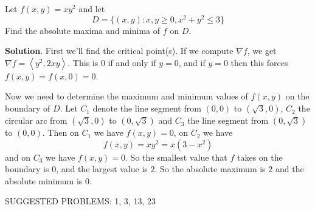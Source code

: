 \documentclass[10pt,]{book}
\theoremstyle{ptxplainnotitle}
\theoremstyle{ptxplaintitle}
\theoremstyle{ptxplainnotitle}
\theoremstyle{ptxplaintitle}
\theoremstyle{ptxplainnotitle}
\theoremstyle{ptxplaintitle}
\theoremstyle{ptxdefinitionnotitle}
\theoremstyle{ptxdefinitiontitle}
\theoremstyle{ptxdefinitionnotitle}
\theoremstyle{ptxdefinitiontitle}
\theoremstyle{ptxdefinitionnotitle}
\theoremstyle{ptxdefinitiontitle}
\theoremstyle{ptxdefinitionnotitle}
\theoremstyle{ptxdefinitiontitle}
\theoremstyle{ptxdefinitionnotitle}
\theoremstyle{ptxdefinitiontitle}
\numberwithin{equation}{section}
\newcommand{\grad}{\nabla}
\newcommand{\dotprod}[1]{\left\langle #1 \right\rangle}
\begin{document}
\begin{example}\label{example-absolute-maxima-and-minima-on-a-circular-sector}
\hypertarget{p-1093}{}%
Let \(f(x,y) = xy^{2}\) and let%
\begin{equation*}
D = \{(x,y) : x,y \geq 0, x^{2} + y^{2} \leq 3\}
\end{equation*}
Find the absolute maxima and minima of \(f\) on \(D\).%
\par\smallskip%
\noindent\textbf{Solution}.\hypertarget{solution-172}{}\quad%
\hypertarget{p-1094}{}%
First we'll find the critical point(s). If we compute \(\grad f\), we get \(\grad f = \dotprod{y^{2}, 2xy}\). This is \(0\) if and only if \(y=0\), and if \(y=0\) then this forces \(f(x,y) = f(x,0) = 0\).%
\par
\hypertarget{p-1095}{}%
Now we need to determine the maximum and minimum values of \(f(x,y)\) on the boundary of \(D\). Let \(C_{1}\) denote the line segment from \((0,0)\) to \((\sqrt{3},0)\), \(C_{2}\) the circular arc from \((\sqrt{3},0)\) to \((0,\sqrt{3})\) and \(C_{3}\) the line segment from \((0,\sqrt{3})\) to \((0,0)\). Then on \(C_{1}\) we have \(f(x,y) = 0\), on \(C_{2}\) we have%
\begin{equation*}
f(x,y) = xy^{2} = x(3-x^{2})
\end{equation*}
and on \(C_{3}\) we have \(f(x,y) = 0\). So the smallest value that \(f\) takes on the boundary is \(0\), and the largest value is \(2\). So the absolute maximum is \(2\) and the absolute minimum is \(0\).%
\end{example}
\hypertarget{p-1096}{}%
SUGGESTED PROBLEMS: 1, 3, 13, 23%
\typeout{************************************************}
\typeout{************************************************}
\end{document}
